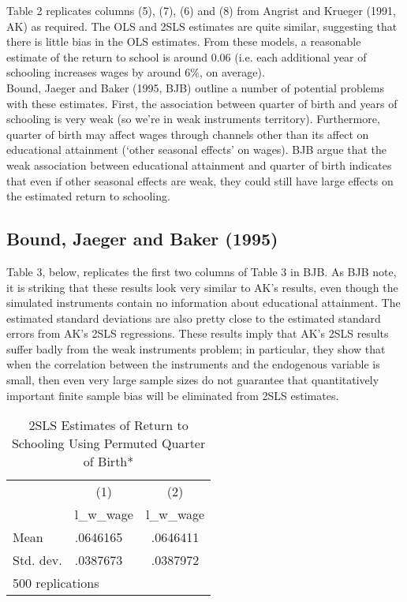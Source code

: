 \documentclass[12pt]{article}
\begin{document}
Table 2 replicates columns (5), (7), (6) and (8) from Angrist and Krueger (1991, AK) as required. The OLS and 2SLS estimates are quite similar, suggesting that there is little bias in the OLS estimates. From these models, a reasonable estimate of the return to school is around 0.06 (i.e. each additional year of schooling increases wages by around 6\%, on average).\\

Bound, Jaeger and Baker (1995, BJB) outline a number of potential problems with these estimates. First, the association between quarter of birth and years of schooling is very weak (so we're in weak instruments territory). Furthermore, quarter of birth may affect wages through channels other than its affect on educational attainment (`other seasonal effects' on wages). BJB argue that the weak association between educational attainment and quarter of birth indicates that even if other seasonal effects are weak, they could still have large effects on the estimated return to schooling.\newpage

\subsection{Bound, Jaeger and Baker (1995)}

Table 3, below, replicates the first two columns of Table 3 in BJB. As BJB note, it is striking that these results look very similar to AK's results, even though the simulated instruments contain no information about educational attainment. The estimated standard deviations are also pretty close to the estimated standard errors from AK's 2SLS regressions. These results imply that AK's 2SLS results suffer badly from the weak instruments problem; in particular, they show that when the correlation between the instruments and the endogenous variable is small, then even very large sample sizes do not guarantee that quantitatively important finite sample bias will be eliminated from 2SLS estimates.

\begin{table}[htpb!]
\centering
\caption{2SLS Estimates of Return to Schooling Using Permuted Quarter of Birth*}
\begin{tabular}{llc}
\hline
            &\multicolumn{1}{c}{(1)}&\multicolumn{1}{c}{(2)} \\
            &\multicolumn{1}{c}{l\_w\_wage}&\multicolumn{1}{c}{l\_w\_wage}\\
\hline
Mean        &      .0646165 &  .0646411       \\
Std. dev. & .0387673 &    .0387972\\
\hline
\multicolumn{3}{l}{\footnotesize *500 replications}\\
\end{tabular}
\end{table}
\end{document}
